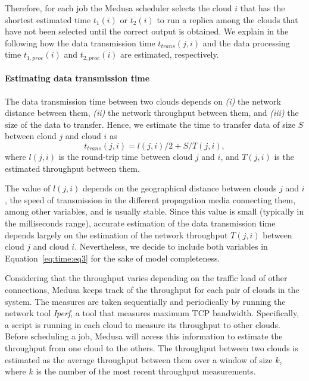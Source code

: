 \documentclass[10pt, conference, compsocconf]{IEEEtran}
\begin{document}
Therefore, for each job the Medusa scheduler selects the cloud $i$ that has the shortest estimated time $t_1(i)$ or $t_2(i)$ to run a replica among the clouds that have not been selected until the correct output is obtained. We explain in the following how the data transmission time $t_{trans}(j, i)$ and the data processing time $t_{1, proc}(i)$ and $t_{2, proc}(i)$ are estimated, respectively.

\paragraph{Estimating data transmission time} The data transmission time between two clouds depends on \textit{(i)} the network distance between them, \textit{(ii)} the network throughput between them, and \textit{(iii)} the size of the data to transfer. Hence, we estimate the time to transfer data of size $S$ between cloud $j$ and cloud $i$ as
\begin{equation}
  \label{eq:time:eq3}
  t_{trans}(j, i) = l(j, i)/2 + S/T(j, i),
\end{equation}
where $l(j, i)$ is the round-trip time between cloud $j$ and $i$, and $T(j, i)$ is the estimated throughput between them.

The value of $l(j, i)$ depends on the geographical distance between clouds $j$ and $i$, the speed of transmission in the different propagation media connecting them, among other variables, and is usually stable. Since this value is small (typically in the milliseconds range), accurate estimation of the data transmission time depends largely on the estimation of the network throughput $T(j, i)$ between cloud $j$ and cloud $i$.
Nevertheless, we decide to include both variables in Equation~\ref{eq:time:eq3} for the sake of model completeness.

Considering that the throughput varies depending on the traffic load of other connections, Medusa keeps track of the throughput for each pair of clouds in the system.
The measures are taken sequentially and periodically by running the network tool \emph{Iperf}, a tool that measures maximum TCP bandwidth.
Specifically, a script is running in each cloud to measure its throughput to other clouds.
Before scheduling a job, Medusa will access this information to estimate the throughput from one cloud to the others. The throughput between two clouds is estimated as the average throughput between them over a window of size $k$, where $k$ is the number of the most recent throughput measurements.
\end{document}
